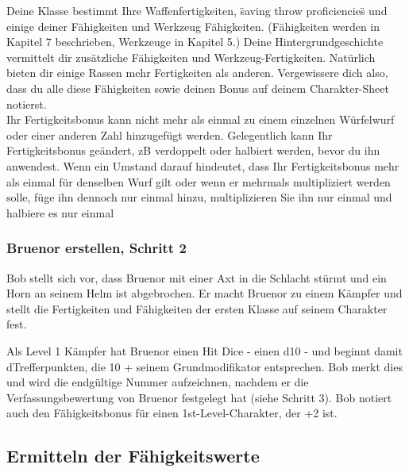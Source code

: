 Deine Klasse bestimmt Ihre Waffenfertigkeiten, \"saving throw proficiencies\"
und einige deiner Fähigkeiten und Werkzeug Fähigkeiten. (Fähigkeiten werden in Kapitel 7 beschrieben, Werkzeuge in Kapitel 5.) Deine Hintergrundgeschichte vermittelt dir zusätzliche Fähigkeiten und Werkzeug-Fertigkeiten. Natürlich bieten dir einige Rassen mehr Fertigkeiten als anderen. Vergewissere dich also, dass du alle diese Fähigkeiten sowie deinen  Bonus auf deinem Charakter-Sheet notierst.\\
Ihr Fertigkeitsbonus kann nicht mehr als einmal zu einem einzelnen Würfelwurf oder einer anderen Zahl hinzugefügt werden. Gelegentlich kann Ihr Fertigkeitsbonus geändert, zB verdoppelt oder halbiert werden, bevor du ihn anwendest. Wenn ein Umstand darauf hindeutet, dass Ihr Fertigkeitsbonus mehr als einmal für denselben Wurf gilt oder wenn er mehrmals multipliziert werden solle, füge ihn dennoch nur einmal hinzu, multiplizieren Sie ihn nur einmal und halbiere es nur einmal
\subsubsection{Bruenor erstellen, Schritt 2}
Bob stellt sich vor, dass Bruenor mit einer Axt in die Schlacht stürmt und ein Horn an seinem Helm ist abgebrochen. Er macht Bruenor zu einem Kämpfer und stellt die Fertigkeiten und Fähigkeiten der ersten Klasse auf seinem Charakter fest. %

Als Level 1 Kämpfer hat Bruenor einen Hit Dice - einen d10 - und beginnt damit dTrefferpunkten, die 10 + seinem Grundmodifikator entsprechen. Bob merkt dies und wird die endgültige Nummer aufzeichnen, nachdem er die Verfassungsbewertung von Bruenor festgelegt hat (siehe Schritt 3). Bob notiert auch den Fähigkeitsbonus für einen 1st-Level-Charakter, der +2 ist.

\subsection{Ermitteln der Fähigkeitswerte}
